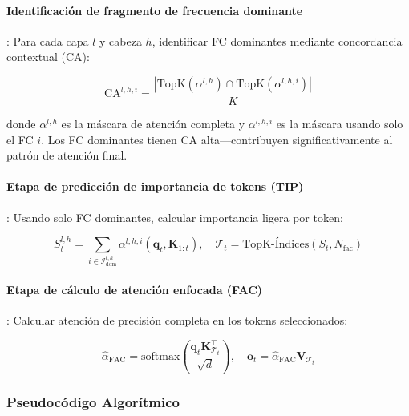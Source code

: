 \paragraph{Identificación de fragmento de frecuencia dominante}: Para cada capa $l$ y cabeza $h$, identificar FC dominantes mediante concordancia contextual (CA):

\[
\text{CA}^{l,h,i} = \frac{|\text{TopK}(\alpha^{l,h}) \cap \text{TopK}(\alpha^{l,h,i})|}{K}
\]

donde $\alpha^{l,h}$ es la máscara de atención completa y $\alpha^{l,h,i}$ es la máscara usando solo el FC $i$. Los FC dominantes tienen CA alta---contribuyen significativamente al patrón de atención final.

\paragraph{Etapa de predicción de importancia de tokens (TIP)}: Usando solo FC dominantes, calcular importancia ligera por token:

\[
S_t^{l,h} = \sum_{i \in \mathcal{I}_{\text{dom}}^{l,h}} \alpha^{l,h,i}(\mathbf{q}_t, \mathbf{K}_{1:t}), \quad \mathcal{T}_t = \text{TopK-Índices}(S_t, N_{\text{fac}})
\]

\paragraph{Etapa de cálculo de atención enfocada (FAC)}: Calcular atención de precisión completa en los tokens seleccionados:

\[
\hat{\alpha}_{\text{FAC}} = \text{softmax}\left(\frac{\mathbf{q}_t \mathbf{K}_{\mathcal{T}_t}^\top}{\sqrt{d}}\right), \quad \mathbf{o}_t = \hat{\alpha}_{\text{FAC}} \mathbf{V}_{\mathcal{T}_t}
\]

\subsubsection{Pseudocódigo Algorítmico}

